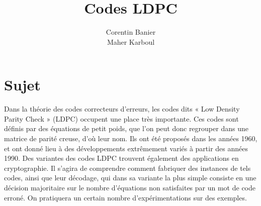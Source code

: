 \documentclass[french,nochapter,11pt]{rapportUB}
\author{ %
  Corentin Banier
  \\
  Maher Karboul
}
\begin{document}
\title{Codes LDPC}

\maketitle

\begin{center}
\tableofcontents %
\clearpage
\end{center}

\section{Sujet}
Dans la théorie des codes correcteurs d’erreurs, les codes dits « Low Density Parity Check » (LDPC) occupent une place très importante. 
Ces codes sont définis par des équations de petit poids, que l’on peut donc regrouper dans une matrice de parité creuse, d’où leur nom. 
Ils ont été proposés dans les années 1960, et ont donné lieu à des développements extrêmement variés à partir des années 1990. Des 
variantes des codes LDPC trouvent également des applications en cryptographie. Il s’agira de comprendre comment fabriquer des instances 
de tels codes, ainsi que leur décodage, qui dans sa variante la plus simple consiste en une décision majoritaire sur le nombre d’équations 
non satisfaites par un mot de code erroné. On pratiquera un certain nombre d’expérimentations sur des exemples.
\clearpage
\end{document}
